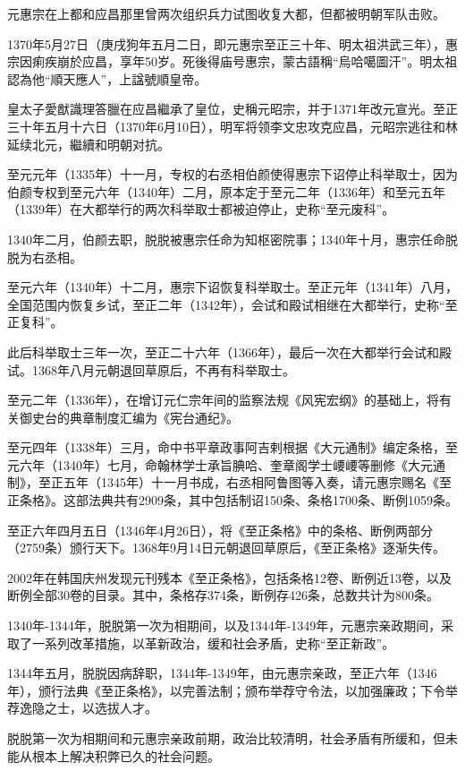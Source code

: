 元惠宗在上都和应昌那里曾两次组织兵力试图收复大都，但都被明朝军队击败。

1370年5月27日（庚戌狗年五月二日，即元惠宗至正三十年、明太祖洪武三年），惠宗因痢疾崩於应昌，享年50岁。死後得庙号惠宗，蒙古語稱“烏哈噶圖汗”。明太祖認為他“順天應人”，上諡號順皇帝。

皇太子愛猷識理答臘在应昌繼承了皇位，史稱元昭宗，并于1371年改元宣光。至正三十年五月十六日（1370年6月10日），明军将领李文忠攻克应昌，元昭宗逃往和林延续北元，繼續和明朝对抗。

至元元年（1335年）十一月，专权的右丞相伯颜使得惠宗下诏停止科举取士，因为伯颜专权到至元六年（1340年）二月，原本定于至元二年（1336年）和至元五年（1339年）在大都举行的两次科举取士都被迫停止，史称“至元废科”。

1340年二月，伯颜去职，脱脱被惠宗任命为知枢密院事；1340年十月，惠宗任命脱脱为右丞相。

至元六年（1340年）十二月，惠宗下诏恢复科举取士。至正元年（1341年）八月，全国范围内恢复乡试，至正二年（1342年），会试和殿试相继在大都举行，史称“至正复科”。

此后科举取士三年一次，至正二十六年（1366年），最后一次在大都举行会试和殿试。1368年八月元朝退回草原后，不再有科举取士。

至元二年（1336年），在增订元仁宗年间的监察法规《风宪宏纲》的基础上，将有关御史台的典章制度汇编为《宪台通纪》。

至元四年（1338年）三月，命中书平章政事阿吉剌根据《大元通制》编定条格，至元六年（1340年）七月，命翰林学士承旨腆哈、奎章阁学士崾崾等删修《大元通制》，至正五年（1345年）十一月书成，右丞相阿鲁图等入奏，请元惠宗赐名《至正条格》。这部法典共有2909条，其中包括制诏150条、条格1700条、断例1059条。

至正六年四月五日（1346年4月26日），将《至正条格》中的条格、断例两部分（2759条）颁行天下。1368年9月14日元朝退回草原后，《至正条格》逐渐失传。

2002年在韩国庆州发现元刊残本《至正条格》，包括条格12卷、断例近13卷，以及断例全部30卷的目录。其中，条格存374条，断例存426条，总数共计为800条。

1340年-1344年，脱脱第一次为相期间，以及1344年-1349年，元惠宗亲政期间，采取了一系列改革措施，以革新政治，缓和社会矛盾，史称“至正新政”。

1344年五月，脱脱因病辞职，1344年-1349年，由元惠宗亲政，至正六年（1346年），颁行法典《至正条格》，以完善法制；颁布举荐守令法，以加强廉政；下令举荐逸隐之士，以选拔人才。

脱脱第一次为相期间和元惠宗亲政前期，政治比较清明，社会矛盾有所缓和，但未能从根本上解决积弊已久的社会问题。

